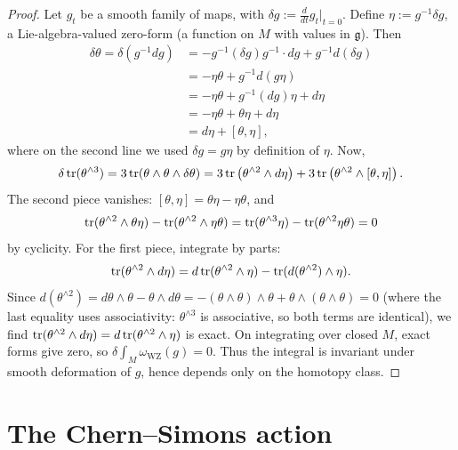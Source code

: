 \begin{proof}
Let $g_t$ be a smooth family of maps, with $\delta g := \frac{d}{dt}g_t|_{t=0}$. Define $\eta := g^{-1}\delta g$, a Lie-algebra-valued zero-form (a function on $M$ with values in $\mathfrak{g}$). Then
\begin{align*}
\delta \theta = \delta(g^{-1}dg) &= -g^{-1}(\delta g)g^{-1}\cdot dg + g^{-1}d(\delta g) \\
&= -\eta\theta + g^{-1}d(g\eta) \\
&= -\eta\theta + g^{-1}(dg)\eta + d\eta \\
&= -\eta\theta + \theta\eta + d\eta \\
&= d\eta + [\theta,\eta],
\end{align*}
where on the second line we used $\delta g = g\eta$ by definition of $\eta$. Now,
\begin{align*}
\delta \operatorname{tr}(\theta^{\wedge 3}) = 3\operatorname{tr}(\theta\wedge\theta\wedge\delta\theta) = 3\operatorname{tr}\left(\theta^{\wedge 2}\wedge d\eta\right) + 3\operatorname{tr}\left(\theta^{\wedge 2}\wedge[\theta,\eta]\right).
\end{align*}
The second piece vanishes: $[\theta,\eta] = \theta\eta - \eta\theta$, and
\begin{equation*}
\operatorname{tr}(\theta^{\wedge 2}\wedge\theta\eta) - \operatorname{tr}(\theta^{\wedge 2}\wedge\eta\theta) = \operatorname{tr}(\theta^{\wedge 3}\eta) - \operatorname{tr}(\theta^{\wedge 2}\eta\theta) = 0
\end{equation*}
by cyclicity. For the first piece, integrate by parts:
\begin{equation*}
\operatorname{tr}(\theta^{\wedge 2}\wedge d\eta) = d\operatorname{tr}(\theta^{\wedge 2}\wedge\eta) - \operatorname{tr}(d(\theta^{\wedge 2})\wedge\eta).
\end{equation*}
Since $d(\theta^{\wedge 2}) = d\theta\wedge\theta - \theta\wedge d\theta = -(\theta\wedge\theta)\wedge\theta + \theta\wedge(\theta\wedge\theta) = 0$ (where the last equality uses associativity: $\theta^{\wedge 3}$ is associative, so both terms are identical), we find $\operatorname{tr}(\theta^{\wedge 2}\wedge d\eta) = d\operatorname{tr}(\theta^{\wedge 2}\wedge\eta)$ is exact. On integrating over closed $M$, exact forms give zero, so $\delta\int_M \omega_{\text{WZ}}(g) = 0$. Thus the integral is invariant under smooth deformation of $g$, hence depends only on the homotopy class.
\end{proof}

\section{The Chern--Simons action}\label{sec:action}

